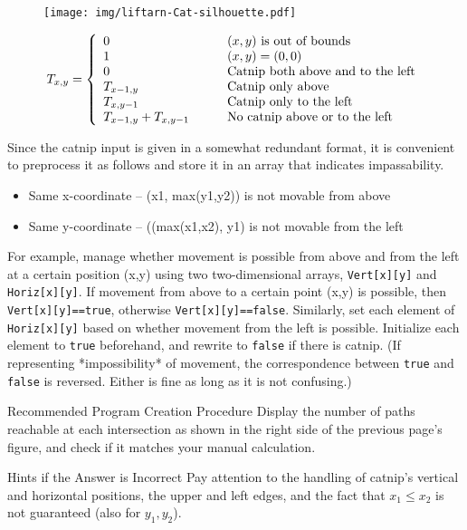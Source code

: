 \begin{wrapfigure}[4]{l}[4pt]{3.5cm}
\texttt{[image: img/liftarn-Cat-silhouette.pdf]}
\end{wrapfigure}

$$
T_{x,y} = \left\{
\begin{array}{l@{\hspace{3em}}l}
  0 & (x,y)\mbox{ is out of bounds}\\
  1 & (x,y) = (0,0)\\
  0 & \mbox{Catnip both above and to the left}\\
  T_{x-1,y} & \mbox{Catnip only above}\\
  T_{x,y-1} & \mbox{Catnip only to the left}\\
  T_{x-1,y}+T_{x,y-1} & \mbox{No catnip above or to the left}
\end{array}\right.
$$

Since the catnip input is given in a somewhat redundant format, it is convenient to preprocess it as follows and store it in an array that indicates impassability.
\begin{itemize}
\setlength{\itemsep}{0pt}
\item Same x-coordinate -- (x1, max(y1,y2)) is not movable from above
\item Same y-coordinate -- ((max(x1,x2), y1) is not movable from the left
\end{itemize}

For example, manage whether movement is possible from above and from the left at a certain position (x,y) using two two-dimensional arrays, \texttt{Vert[x][y]} and \texttt{Horiz[x][y]}.
If movement from above to a certain point (x,y) is possible, then \texttt{Vert[x][y]==true}, otherwise \texttt{Vert[x][y]==false}. Similarly, set each element of \texttt{Horiz[x][y]} based on whether movement from the left is possible. Initialize each element to \texttt{true} beforehand, and rewrite to \texttt{false} if there is catnip. (If representing *impossibility* of movement, the correspondence between \texttt{true} and \texttt{false} is reversed. Either is fine as long as it is not confusing.)

\begin{tipsbox}{Recommended Program Creation Procedure}
  Display the number of paths reachable at each intersection as shown in the right side of the previous page's figure, and check if it matches your manual calculation.
\end{tipsbox}
\begin{debugbox}{Hints if the Answer is Incorrect}
  Pay attention to the handling of catnip's vertical and horizontal positions, the upper and left edges, and the fact that $x_1 \le x_2$ is not guaranteed (also for $y_1,y_2$).
\end{debugbox}

